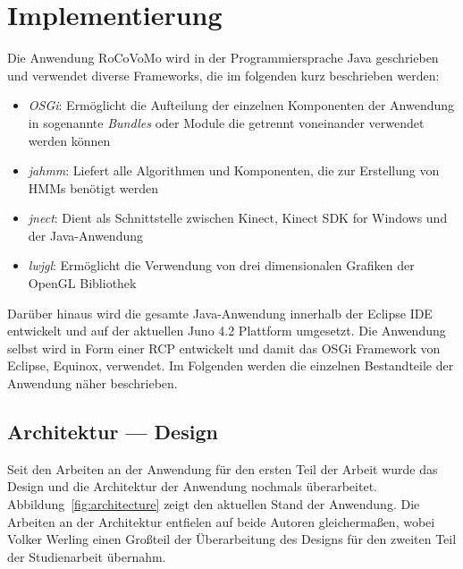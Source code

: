 \chapter{Implementierung}
\label{chap:Implementierung}

Die Anwendung RoCoVoMo wird in der Programmiersprache Java geschrieben und verwendet diverse Frameworks, die im folgenden kurz beschrieben werden:

\begin{itemize}
\item \textit{\gls{OSGi}}: Erm\"oglicht die Aufteilung der einzelnen Komponenten der Anwendung in sogenannte \textit{Bundles} oder Module die getrennt voneinander verwendet werden k\"onnen
\item \textit{jahmm}: Liefert alle Algorithmen und Komponenten, die zur Erstellung von \glspl{HMM} ben\"otigt werden
\item \textit{jnect}: Dient als Schnittstelle zwischen Kinect, Kinect SDK for Windows und der Java-Anwendung
\item \textit{lwjgl}: Erm\"oglicht die Verwendung von drei dimensionalen Grafiken der OpenGL Bibliothek
\end{itemize}

Dar\"uber hinaus wird die gesamte Java-Anwendung innerhalb der \gls{Eclipse} \gls{IDE} entwickelt und auf der aktuellen Juno 4.2 Plattform umgesetzt. Die Anwendung selbst wird in Form einer \gls{RCP} entwickelt und damit das \gls{OSGi} Framework von Eclipse, \gls{Equinox}, verwendet.
\newline
Im Folgenden werden die einzelnen Bestandteile der Anwendung n\"aher beschrieben.

\section{Architektur --- Design}
Seit den Arbeiten an der Anwendung f\"ur den ersten Teil der Arbeit wurde das Design und die Architektur der Anwendung nochmals \"uberarbeitet. Abbildung~\ref{fig:architecture} zeigt den aktuellen Stand der Anwendung.
\newline
Die Arbeiten an der Architektur entfielen auf beide Autoren gleicherma\ss en, wobei Volker Werling einen Gro\ss teil der \"Uberarbeitung des Designs f\"ur den zweiten Teil der Studienarbeit \"ubernahm.

